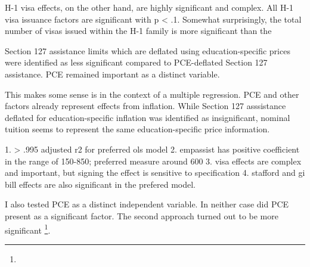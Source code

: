 \documentclass[review]{elsarticle}
\begin{document}

    H-1 visa effects, on the other hand, are highly significant and complex.
    All H-1 visa issuance factors are significant with p < .1.
    Somewhat surprisingly, the total number of visas issued within the H-1 family is more significant than the

    Section 127 assistance limits which are deflated using education-specific prices were identified as less significant
    compared to PCE-deflated Section 127 assistance.
    PCE remained important as a distinct variable.
    
    This makes some sense is in the context of a multiple regression.
    PCE and other factors already represent effects from inflation.
    While Section 127 asssistance deflated for education-specific inflation was identified as insignificant,
    nominal tuition seems to represent the same education-specific price information.

    1. > .995 adjusted r2 for preferred ols model
    2. empassist has positive coefficient in the range of 150-850; preferred measure around 600
    3. visa effects are complex and important, but signing the effect is sensitive to specification
    4. stafford and gi bill effects are also significant in the prefered model.

    I also tested PCE as a distinct independent variable.
    In neither case did PCE present as a significant factor.
    The second approach turned out to be more significant
    \footnote{
    }.


    
\end{document}
